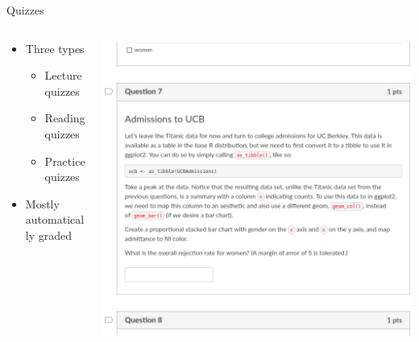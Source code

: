 \begin{frame}{Quizzes}
  \begin{columns}[c,onlytextwidth]
    \begin{column}{0.5\linewidth}
      \begin{itemize}
        \item Three types
              \begin{itemize}
                \item Lecture quizzes
                \item Reading quizzes
                \item Practice quizzes
              \end{itemize}
        \item Mostly automatically graded
      \end{itemize}
    \end{column}
    \begin{column}{0.5\linewidth}
      \includegraphics[width=\textwidth]{figures/quiz.png}
    \end{column}
  \end{columns}
\end{frame}

